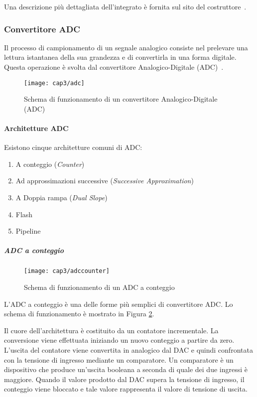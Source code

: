 Una descrizione più dettagliata dell'integrato è fornita sul sito del costruttore~\cite{sitedac902}.

\subsubsection{Convertitore ADC}
Il processo di campionamento di un segnale analogico consiste nel prelevare una lettura istantanea della sua grandezza e di convertirla in una forma digitale. Questa operazione è svolta dal convertitore Analogico-Digitale (ADC)~\cite{storeyelet}.
\begin{figure}  
  \begin{center}
    \texttt{[image: cap3/adc]}
    \caption{Schema di funzionamento di un convertitore Analogico-Digitale (ADC)}
    \label{adc}
  \end{center}
\end{figure}

\paragraph{Architetture ADC}
Esistono cinque architetture comuni di ADC:
\begin{enumerate}
	\item A conteggio (\textit{Counter})
	\item Ad approssimazioni successive (\textit{Successive Approximation})
	\item A Doppia rampa (\textit{Dual Slope})
	\item Flash
	\item Pipeline
\end{enumerate}

\subparagraph{\textbf{ADC a conteggio}}
\begin{figure}  
  \begin{center}
    \texttt{[image: cap3/adccounter]}
    \caption{Schema di funzionamento di un ADC a conteggio}
    \label{adccounter}
  \end{center}
\end{figure}
L'ADC a conteggio è una delle forme più semplici di convertitore ADC. Lo schema di funzionamento è mostrato in Figura \ref{adccounter}.

Il cuore dell'architettura è costituito da un contatore incrementale. La conversione viene effettuata iniziando un nuovo conteggio a partire da zero. L'uscita del contatore viene convertita in analogico dal DAC e quindi confrontata con la tensione di ingresso mediante un comparatore. Un comparatore è un dispositivo che produce un'uscita booleana a seconda di quale dei due ingressi è maggiore. Quando il valore prodotto dal DAC supera la tensione di ingresso, il conteggio viene bloccato e tale valore rappresenta il valore di tensione di uscita.

